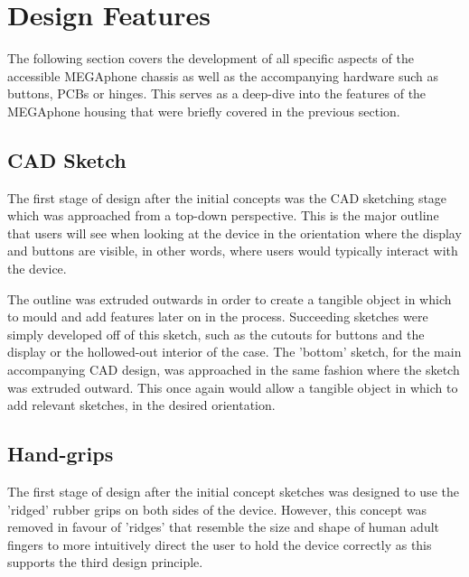 \section{Design Features}

The following section covers the development of all specific aspects of the accessible MEGAphone chassis as well as the accompanying hardware such as buttons, PCBs or hinges.
This serves as a deep-dive into the features of the MEGAphone housing that were briefly covered in the previous section.

\subsection{CAD Sketch}

The first stage of design after the initial concepts was the CAD sketching stage which was approached from a top-down perspective.
This is the major outline that users will see when looking at the device in the orientation where the display and buttons are visible, in other words, where users would typically interact with the device.

The outline was extruded outwards in order to create a tangible object in which to mould and add features later on in the process.
Succeeding sketches were simply developed off of this sketch, such as the cutouts for buttons and the display or the hollowed-out interior of the case.
The 'bottom' sketch, for the main accompanying CAD design, was approached in the same fashion where the sketch was extruded outward.
This once again would allow a tangible object in which to add relevant sketches, in the desired orientation.

\subsection{Hand-grips}

The first stage of design after the initial concept sketches was designed to use the 'ridged' rubber grips on both sides of the device.
However, this concept was removed in favour of 'ridges' that resemble the size and shape of human adult fingers to more intuitively direct the user to hold the device correctly as this supports the third design principle.

